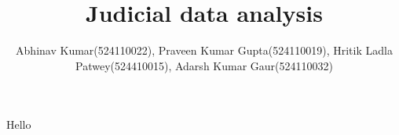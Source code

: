 \documentclass{report}
\title{Judicial data analysis}
\author{Abhinav Kumar(524110022), Praveen Kumar Gupta(524110019), Hritik Ladla Patwey(524410015), Adarsh Kumar Gaur(524110032)}
\begin{document}
\maketitle
Hello
\end{document}
